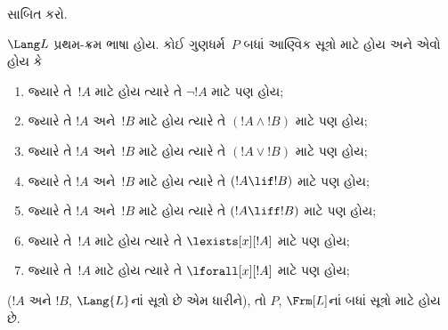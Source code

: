 \begin{prob}
     સાબિત કરો.
\end{prob}

\begin{lem}[\emph{સૂત્રો પર અનુમાનનો સિદ્ધાંત}]
    $\Lang L$ પ્રથમ-ક્રમ ભાષા હોય. કોઈ ગુણધર્મ~$P$ બધાં આણ્વિક
    સૂત્રો માટે હોય અને એવો હોય કે
    \begin{enumerate}
        \item જ્યારે તે~$!A$ માટે હોય ત્યારે તે
            $\lnot !A$ માટે પણ હોય;
        \item જ્યારે તે $!A$ અને~$!B$ માટે હોય ત્યારે તે
            $(!A \land !B)$ માટે પણ હોય;
        \item જ્યારે તે $!A$ અને~$!B$ માટે હોય ત્યારે તે
            $(!A \lor !B)$ માટે પણ હોય;
        \item જ્યારે તે $!A$ અને~$!B$ માટે હોય ત્યારે તે
            $(!A \lif !B)$ માટે પણ હોય;
        \item જ્યારે તે $!A$ અને~$!B$ માટે હોય ત્યારે તે
            $(!A \liff !B)$ માટે પણ હોય;
        \item જ્યારે તે~$!A$ માટે હોય ત્યારે તે
            $\lexists[x][!A]$ માટે પણ હોય;
        \item જ્યારે તે~$!A$ માટે હોય ત્યારે તે
            $\lforall[x][!A]$ માટે પણ હોય;
  \end{enumerate}
  ($!A$ અને $!B$, $\Lang{L}$નાં સૂત્રો છે એમ ધારીને),
  તો $P$, $\Frm[L]$નાં બધાં સૂત્રો માટે હોય છે.
\end{lem}
\endgroup


\begingroup
\makeatletter{}\makeatother


\label{guunit:OLP-0153}


